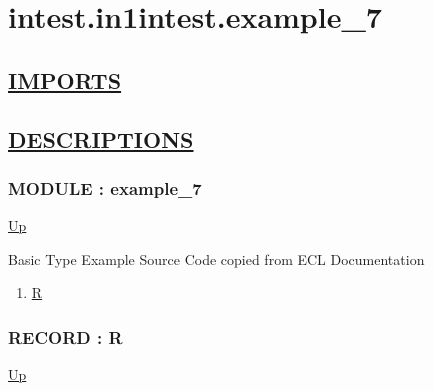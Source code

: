 \chapter*{intest.in1intest.example\_7}
\hypertarget{ecldoc:toc:intest.in1intest.example_7}{}

\section*{\underline{IMPORTS}}

\section*{\underline{DESCRIPTIONS}}
\subsection*{MODULE : example\_7}
\hypertarget{ecldoc:intest.in1intest.example_7}{}
\par
\begin{minipage}[t]{\textwidth}
\begin{flushleft}
  
\end{flushleft}
\end{minipage}
\hyperlink{ecldoc:toc:intest/in1intest}{Up} \\
\par
Basic Type Example Source Code copied from ECL Documentation \\
\par
\begin{enumerate}
\item \hyperlink{ecldoc:intest.in1intest.example_7.r}{R}
\end{enumerate}
\subsection*{RECORD : R}
\hypertarget{ecldoc:intest.in1intest.example_7.r}{}
\par
\begin{minipage}[t]{\textwidth}
\begin{flushleft}
  
\end{flushleft}
\end{minipage}
\hyperlink{ecldoc:intest.in1intest.example_7}{Up} \\
\par
\par

